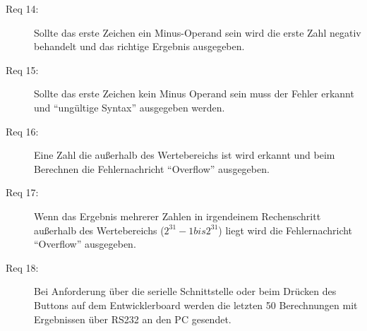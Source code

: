 \begin{description}
\item[Req 14:] Sollte das erste Zeichen ein Minus-Operand sein wird die erste Zahl negativ behandelt und das richtige Ergebnis ausgegeben.
\item[Req 15:] Sollte das erste Zeichen kein Minus Operand sein muss der Fehler erkannt und ``ungültige Syntax'' ausgegeben werden.
\item[Req 16:] Eine Zahl die außerhalb des Wertebereichs ist wird erkannt und beim Berechnen die Fehlernachricht ``Overflow'' ausgegeben.
\item[Req 17:] Wenn das Ergebnis mehrerer Zahlen in irgendeinem Rechenschritt außerhalb des Wertebereichs ($2^31 -1 bis 2^31$) liegt wird die
Fehlernachricht ``Overflow'' ausgegeben.
\item[Req 18:] Bei Anforderung über die serielle Schnittstelle oder beim Drücken des Buttons auf dem Entwicklerboard werden die letzten 50 Berechnungen
mit Ergebnissen über RS232 an den PC gesendet.

\end{description}